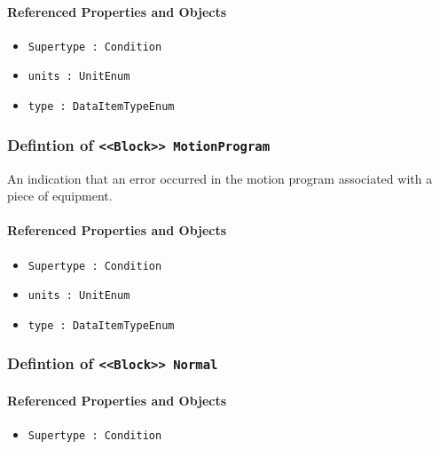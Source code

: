 \FloatBarrier
\paragraph{Referenced Properties and Objects}

\begin{itemize}
\item \texttt{Supertype : Condition}

\item \texttt{units : UnitEnum}

\item \texttt{type : DataItemTypeEnum}

\end{itemize}
\FloatBarrier
\subsubsection{Defintion of \texttt{<<Block>> MotionProgram}}
  \label{type:MotionProgram}

\FloatBarrier

An indication that an error occurred in the motion program associated with a piece of equipment.

\FloatBarrier
\paragraph{Referenced Properties and Objects}

\begin{itemize}
\item \texttt{Supertype : Condition}

\item \texttt{units : UnitEnum}

\item \texttt{type : DataItemTypeEnum}

\end{itemize}
\FloatBarrier
\subsubsection{Defintion of \texttt{<<Block>> Normal}}
  \label{type:Normal}

\FloatBarrier



\FloatBarrier
\paragraph{Referenced Properties and Objects}

\begin{itemize}
\item \texttt{Supertype : Condition}

\end{itemize}
\FloatBarrier
